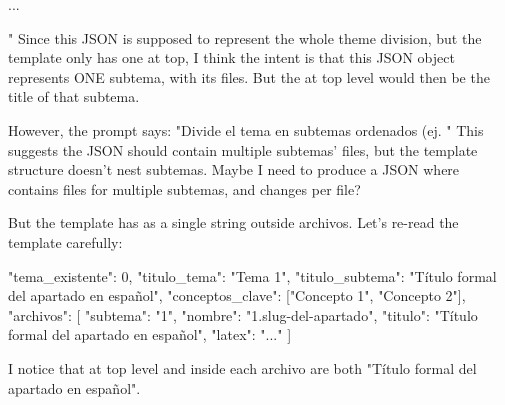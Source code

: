 ...

" Since this JSON is supposed to represent the whole theme division, but the template only has one  at top, I think the intent is that this JSON object represents ONE subtema, with its files. But the  at top level would then be the title of that subtema.

However, the prompt says: "Divide el tema en subtemas ordenados (ej. " This suggests the JSON should contain multiple subtemas' files, but the template structure doesn't nest subtemas. Maybe I need to produce a JSON where  contains files for multiple subtemas, and  changes per file?

But the template has  as a single string outside archivos. Let's re-read the template carefully:

\begin{codigo}
{
  "tema_existente": 0,
  "titulo_tema": "Tema 1",
  "titulo_subtema": "Título formal del apartado en español",
  "conceptos_clave": ["Concepto 1", "Concepto 2"],
  "archivos": [
    {
      "subtema": "1",
      "nombre": "1.slug-del-apartado",
      "titulo": "Título formal del apartado en español",
      "latex": "..."
    }
  ]
}
\end{codigo}



I notice that  at top level and  inside each archivo are both "Título formal del apartado en español".

